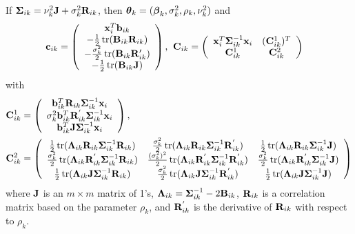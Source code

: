 \begin{theorem}
If $\boldsymbol\Sigma_{ik}=\nu_{k}^{2}\mathbf J +\sigma_{k}^{2}\mathbf R_{ik}$, then $\boldsymbol\theta_{k}=(\boldsymbol\beta_{k},\sigma^{2}_{k},\rho_{k},\nu_{k}^{2})$ and
\begin{align*}
\mathbf c_{ik}=\left( \begin{array}{c}\mathbf x_{i}^{T}\mathbf b_{ik}\\ -\frac{1}{2}\operatorname{tr}( \mathbf B_{ik} \mathbf R_{ik})\\ -\frac{\sigma^{2}_{k}}{2}\operatorname{tr}( \mathbf B_{ik} \mathbf R'_{ik})\\
-\frac{1}{2}\operatorname{tr}( \mathbf B_{ik} \mathbf J)
\end{array}\right),&\;\;
\mathbf C_{ik}=\left(\begin{array}{cc} \mathbf x_{i}^{T}\boldsymbol\Sigma_{ik}^{-1}\mathbf x_{i}&(\mathbf C^{1}_{ik})^{T}\\
\mathbf C^{1}_{ik}&\mathbf C^{2}_{ik}
\end{array} \right)
\end{align*}
with
\begin{align*}
\mathbf C^{1}_{ik}&=\left(\begin{array}{c} 
\mathbf b^{T}_{ik}\mathbf R_{ik}\boldsymbol\Sigma_{ik}^{-1}\mathbf x_{i}\\
\sigma^{2}_{k}\mathbf b_{ik}^{T}\mathbf R^{'}_{ik} \boldsymbol\Sigma_{ik}^{-1}\mathbf x_{i}\\
 \mathbf b_{ik}^{T}\mathbf J \boldsymbol\Sigma_{ik}^{-1}\mathbf x_{i}
\end{array} \right),\\
\mathbf C^{2}_{ik}&=\left(\begin{array}{ccc} \frac{1}{2}\operatorname{tr}(\boldsymbol \Lambda_{ik}\mathbf R_{ik}\boldsymbol\Sigma_{ik}^{-1}\mathbf R_{ik})&\frac{\sigma^{2}_{k}}{2}\operatorname{tr}(\boldsymbol \Lambda_{ik}\mathbf R_{ik}\boldsymbol\Sigma_{ik}^{-1}\mathbf R^{'}_{ik})&\frac{1}{2}\operatorname{tr}(\boldsymbol \Lambda_{ik}\mathbf R_{ik}\boldsymbol\Sigma_{ik}^{-1}\mathbf J)\\ 
\frac{\sigma^{2}_{k}}{2}\operatorname{tr}(\boldsymbol \Lambda_{ik}\mathbf R^{'}_{ik}\boldsymbol\Sigma_{ik}^{-1}\mathbf R_{ik})&\frac{(\sigma^{2}_{k})^{2}}{2}\operatorname{tr}(\boldsymbol \Lambda_{ik}\mathbf R^{'}_{ik}\boldsymbol\Sigma_{ik}^{-1}\mathbf R^{'}_{ik})&\frac{\sigma^{2}_{k}}{2}\operatorname{tr}(\boldsymbol \Lambda_{ik}\mathbf R^{'}_{ik}\boldsymbol\Sigma_{ik}^{-1}\mathbf J)\\
\frac{1}{2}\operatorname{tr}(\boldsymbol \Lambda_{ik}\mathbf J\boldsymbol\Sigma_{ik}^{-1}\mathbf R_{ik})&\frac{\sigma^{2}_{k}}{2}\operatorname{tr}(\boldsymbol \Lambda_{ik}\mathbf J\boldsymbol\Sigma_{ik}^{-1}\mathbf R^{'}_{ik})&\frac{1}{2}\operatorname{tr}(\boldsymbol \Lambda_{ik}\mathbf J\boldsymbol\Sigma_{ik}^{-1}\mathbf J)
\end{array} \right)
\end{align*}
where $\mathbf J$ is an $m\times m$ matrix of 1's, $\boldsymbol \Lambda_{ik} = \boldsymbol\Sigma_{ik}^{-1}-2\mathbf B_{ik}$, $\mathbf R_{ik}$ is a correlation matrix based on the parameter $\rho_{k}$, and $\mathbf R^{'}_{ik}$ is the derivative of $\mathbf R_{ik}$ with respect to $\rho_{k}$. 
\end{theorem}

